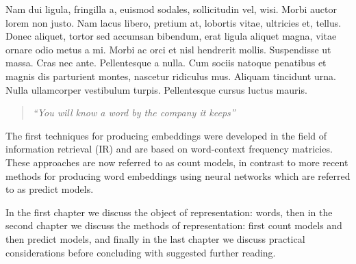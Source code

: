 \documentclass{ucetd}
\begin{document}
Nam dui ligula, fringilla a, euismod sodales, sollicitudin vel, wisi. Morbi 
auctor lorem non justo. Nam lacus libero, pretium at, lobortis vitae, 
ultricies et, tellus. Donec aliquet, tortor sed accumsan bibendum, erat 
ligula aliquet magna, vitae ornare odio metus a mi. Morbi ac orci et nisl 
hendrerit mollis. Suspendisse ut massa. Cras nec ante. Pellentesque a nulla. 
Cum sociis natoque penatibus et magnis dis parturient montes, nascetur 
ridiculus mus. Aliquam tincidunt urna. Nulla ullamcorper vestibulum turpis. 
Pellentesque cursus luctus mauris.

\begin{quote}
  \emph{``You will know a word by the company it keeps''}
\end{quote}

The first techniques for producing embeddings were developed in the field of information retrieval (IR) and are based on word-context frequency matricies. These approaches are now referred to as count models, in contrast to more recent methods for producing word embeddings using neural networks which are referred to as predict models.

In the first chapter we discuss the object of representation: words, then in the second chapter we discuss the methods of representation: first count models and then predict models, and finally in the last chapter we discuss practical considerations before concluding with suggested further reading. 

\mainmatter{




}

\makebibliography
\end{document}
